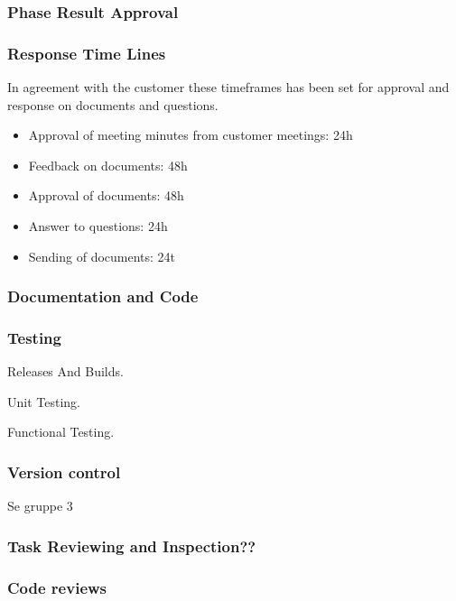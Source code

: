 \subsubsection{Phase Result Approval}

\subsubsection{Response Time Lines}

In agreement with the customer these timeframes has been set for approval and response on documents and questions.

\begin{itemize}
	\item Approval of meeting minutes from customer meetings: 24h
	\item Feedback on documents: 48h
	\item Approval of documents: 48h
	\item Answer to questions: 24h
	\item Sending of documents: 24t
\end{itemize}

\subsubsection{Documentation and Code}

\subsubsection{Testing}

Releases And Builds.

Unit Testing.

Functional Testing.

\subsubsection{Version control}

Se gruppe 3

\subsubsection{Task Reviewing and Inspection??}

\subsubsection{Code reviews}
